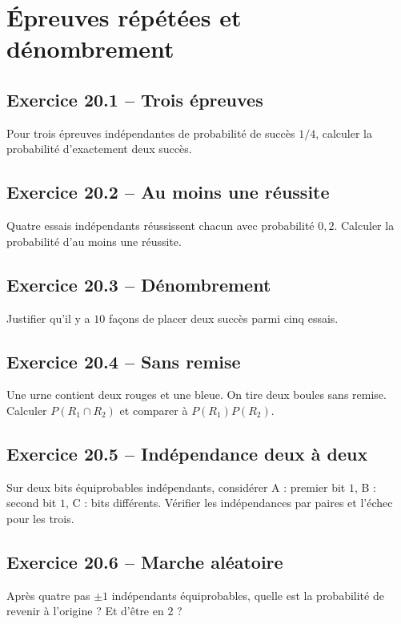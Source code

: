 \chapter{Épreuves répétées et dénombrement}
\section*{Exercice 20.1 -- Trois épreuves}
Pour trois épreuves indépendantes de probabilité de succès $1/4$, calculer la probabilité d'exactement deux succès.

\section*{Exercice 20.2 -- Au moins une réussite}
Quatre essais indépendants réussissent chacun avec probabilité $0{,}2$. Calculer la probabilité d'au moins une réussite.

\section*{Exercice 20.3 -- Dénombrement}
Justifier qu'il y a $10$ façons de placer deux succès parmi cinq essais.

\section*{Exercice 20.4 -- Sans remise}
Une urne contient deux rouges et une bleue. On tire deux boules sans remise. Calculer $P(R_1\cap R_2)$ et comparer à $P(R_1)P(R_2)$.

\section*{Exercice 20.5 -- Indépendance deux à deux}
Sur deux bits équiprobables indépendants, considérer A : premier bit $1$, B : second bit $1$, C : bits différents. Vérifier les indépendances par paires et l'échec pour les trois.

\section*{Exercice 20.6 -- Marche aléatoire}
Après quatre pas $\pm1$ indépendants équiprobables, quelle est la probabilité de revenir à l'origine ? Et d'être en $2$ ?
